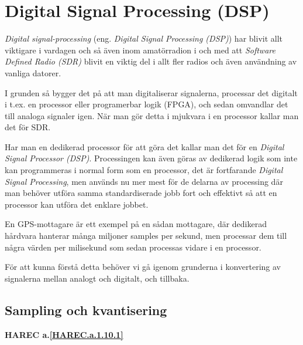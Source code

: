 \section{Digital Signal Processing (DSP)}

\begin{rev-nytt}[MAD]

\emph{Digital signal-processing} (eng. \emph{Digital Signal Processing (DSP)})
har blivit allt viktigare i vardagen och så även inom amatörradion i och med
att \emph{Software Defined Radio (SDR)} blivit en viktig del i allt fler
radios och även användning av vanliga datorer.

I grunden så bygger det på att man digitaliserar signalerna, processar det
digitalt i t.ex. en processor eller programerbar logik (FPGA), och sedan
omvandlar det till analoga signaler igen. När man gör detta i mjukvara i en
processor kallar man det för SDR.

Har man en dedikerad processor för att göra det kallar man det för en
\emph{Digital Signal Processor (DSP)}. Processingen kan även göras av dedikerad
logik som inte kan programmeras i normal form som en processor, det är
fortfarande \emph{Digital Signal Processing}, men används
nu mer mest för de delarna av processing där man behöver utföra samma
standardiserade jobb fort och effektivt så att en processor kan utföra det
enklare jobbet.

En GPS-mottagare är ett exempel på en sådan mottagare, där dedikerad hårdvara
hanterar många miljoner samples per sekund, men processar dem till några värden
per milisekund som sedan processas vidare i en processor.

För att kunna förstå detta behöver vi gå igenom grunderna i konvertering av
signalerna mellan analogt och digitalt, och tillbaka.

\end{rev-nytt}

\subsection{Sampling och kvantisering}
\textbf{HAREC a.\ref{HAREC.a.1.10.1}\label{myHAREC.a.1.10.1}}

